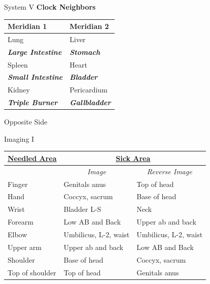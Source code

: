\begin{frame}{System V}
  \textbf{\Large Clock Neighbors}

  \begin{table}[]
    \begin{tabular}{@{}ll@{}}
      \toprule
      Meridian 1                        & Meridian 2                    \\ \midrule
      Lung                              & Liver                         \\
      \textit{\textbf{Large Intestine}} & \textit{\textbf{Stomach}}     \\
      Spleen                            & Heart                         \\
      \textit{\textbf{Small Intestine}} & \textit{\textbf{Bladder}}     \\
      Kidney                            & Pericardium                   \\
      \textit{\textbf{Triple Burner}}   & \textit{\textbf{Gallbladder}} \\ \bottomrule
    \end{tabular}
  \end{table}
  
  \begin{ns}
    Opposite Side
  \end{ns}
\end{frame}

\begin{frame}{Imaging I}
  \begin{table}[]
    \begin{tabular}{l|ll}
      {\ul \textbf{Needled Area}} & \multicolumn{2}{c}{{\ul \textbf{Sick Area}}}                                    \\ \hline
      & \multicolumn{1}{c}{\textit{Image}} & \multicolumn{1}{c}{\textit{Reverse Image}} \\
      Finger                      & Genitals anus                      & Top of head                                \\
      Hand                        & Coccyx, sacrum                     & Base of head                               \\
      Wrist                       & Bladder L-S                        & Neck                                       \\
      Forearm                     & Low AB and Back                    & Upper ab and back                          \\
      Elbow                       & Umbilicus, L-2, waist              & Umbilicus, L-2, waist                      \\
      Upper arm                   & Upper ab and back                  & Low AB and Back                            \\
      Shoulder                    & Base of head                       & Coccyx, sacrum                             \\
      Top of shoulder             & Top of head                        & Genitals anus                             
    \end{tabular}
  \end{table}
\end{frame}

